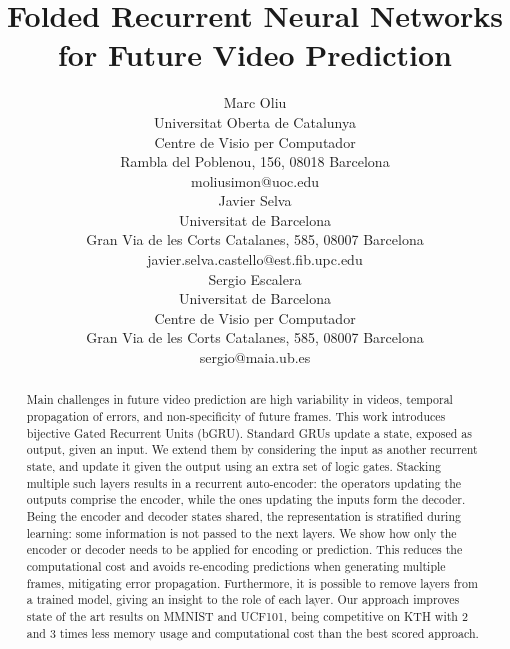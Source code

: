 \documentclass[runningheads]{llncs}
\begin{document}
\pagestyle{headings}
\mainmatter
\def\ECCV18SubNumber{2990}  

\title{Folded Recurrent Neural Networks for Future Video Prediction} 

\titlerunning{~}
\authorrunning{~}

\author{
Marc Oliu\\
Universitat Oberta de Catalunya\\
Centre de Visio per Computador\\
Rambla del Poblenou, 156, 08018 Barcelona\\
{\small moliusimon@uoc.edu}\\
\vspace{2mm}
Javier Selva\\
Universitat de Barcelona\\
Gran Via de les Corts Catalanes, 585, 08007 Barcelona\\
{\small javier.selva.castello@est.fib.upc.edu}\\
\vspace{2mm}
Sergio Escalera\\
Universitat de Barcelona\\
Centre de Visio per Computador\\
Gran Via de les Corts Catalanes, 585, 08007 Barcelona\\
{\small sergio@maia.ub.es}
}
\institute{}


\maketitle



\vspace{-3mm}
\begin{abstract} Main challenges in future video prediction are high variability in videos, temporal propagation of errors, and non-specificity of future frames. This work introduces bijective Gated Recurrent Units (bGRU). Standard GRUs update a state, exposed as output, given an input. We extend them by considering the input as another recurrent state, and update it given the output using an extra set of logic gates. Stacking multiple such layers results in a recurrent auto-encoder: the operators updating the outputs comprise the encoder, while the ones updating the inputs form the decoder. Being the encoder and decoder states shared, the representation is stratified during learning: some information is not passed to the next layers. We show how only the encoder or decoder needs to be applied for encoding or prediction. This reduces the computational cost and avoids re-encoding predictions when generating multiple frames, mitigating error propagation. Furthermore, it is possible to remove layers from a trained model, giving an insight to the role of each layer. Our approach improves state of the art results on MMNIST and UCF101, being competitive on KTH with 2 and 3 times less memory usage and computational cost than the best scored approach. 
\end{abstract}
\end{document}
